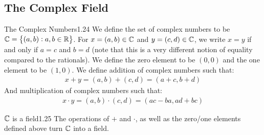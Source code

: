 \subsection{The Complex Field}
\setcounter{rudin}{23}
\begin{definition}{The Complex Numbers}{1.24}
    We define the set of complex numbers to be $\mathbb{C} = \set{(a, b): a, b \in \mathbb{R}}$. For $x = (a, b) \in \mathbb{C}$ and $y = (c, d) \in \mathbb{C}$, we write $x = y$ if and only if $a = c$ and $b = d$ (note that this is a very different notion of equality compared to the rationals). We define the zero element to be $(0, 0)$ and the one element to be $(1, 0)$. We define addition of complex numbers such that:
    \begin{align*}
        x + y = (a, b) + (c, d) = (a + c, b + d)
    \end{align*}
    And multiplication of complex numbers such that:
    \begin{align*}
        x\cdot y = (a, b)\cdot (c, d) = (ac - ba, ad + bc)
    \end{align*}
\end{definition}
\begin{theorem}{$\mathbb{C}$ is a field}{1.25}
    The operations of $+$ and $\cdot$, as well as the zero/one elements defined above turn $\mathbb{C}$ into a field. 
\end{theorem}
